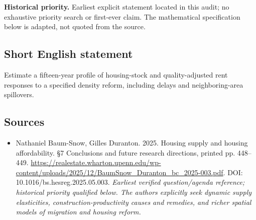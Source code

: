 \documentclass[11pt]{article}
\begin{document}
\par\textbf{Historical priority.} Earliest explicit statement located in this audit; no exhaustive priority search or first-ever claim. The mathematical specification below is adapted, not quoted from the source.

\subsection{Short English statement}
Estimate a fifteen-year profile of housing-stock and quality-adjusted rent responses to a specified density reform, including delays and neighboring-area spillovers.

\subsection{Sources}
\begin{itemize}\raggedright
\item[\textnormal{[S1]}]\hypertarget{source:30007742:1}{} Nathaniel Baum-Snow, Gilles Duranton. 2025. Housing supply and housing affordability. §7 Conclusions and future research directions, printed pp. 448–449.
\url{https://realestate.wharton.upenn.edu/wp-content/uploads/2025/12/BaumSnow_Duranton_bc_2025-003.pdf}.
DOI: 10.1016/bs.hesreg.2025.05.003.
{\small\textit{Earliest verified question/agenda reference; historical priority qualified below. The authors explicitly seek dynamic supply elasticities, construction-productivity causes and remedies, and richer spatial models of migration and housing reform.}}
\end{itemize}
\end{document}
